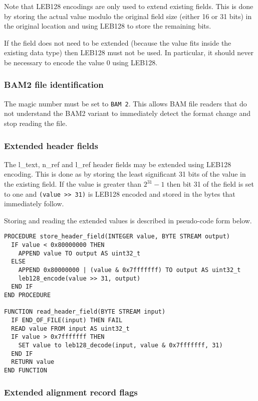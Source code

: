 \documentclass[10pt]{article}
\begin{document}
Note that LEB128 encodings are only used to extend existing fields.
This is done by storing the actual value modulo the original field size
(either 16 or 31 bits) in the original location and using LEB128 to store the
remaining bits.

If the field does not need to be extended (because the value fits inside the
existing data type) then LEB128 must not be used.
In particular, it should never be necessary to encode the value 0 using LEB128.

\subsubsection{BAM2 file identification}

The {\sf magic} number must be set to {\tt BAM 2}.
This allows BAM file readers that do not understand the BAM2 variant to
immediately detect the format change and stop reading the file.

\subsubsection{Extended header fields}\label{sec:v2-extended-header}

The {\sf l\_text}, {\sf n\_ref} and {\sf l\_ref} header fields may be
extended using LEB128 encoding.
This is done as by storing the least significant 31 bits of the value in
the existing field.
If the value is greater than $2^{31} - 1$ then bit 31 of the field is set to
one and {\tt (value >> 31)} is LEB128 encoded and stored in the bytes that
immediately follow.

Storing and reading the extended values is described in pseudo-code form
below.

\begin{verbatim}
PROCEDURE store_header_field(INTEGER value, BYTE STREAM output)
  IF value < 0x80000000 THEN
    APPEND value TO output AS uint32_t
  ELSE
    APPEND 0x80000000 | (value & 0x7fffffff) TO output AS uint32_t
    leb128_encode(value >> 31, output)
  END IF
END PROCEDURE

FUNCTION read_header_field(BYTE STREAM input)
  IF END_OF_FILE(input) THEN FAIL
  READ value FROM input AS uint32_t
  IF value > 0x7fffffff THEN
    SET value to leb128_decode(input, value & 0x7fffffff, 31)
  END IF
  RETURN value
END FUNCTION
\end{verbatim}

\subsubsection{Extended alignment record flags}\label{sec:v2-alignment-flags}
\end{document}
